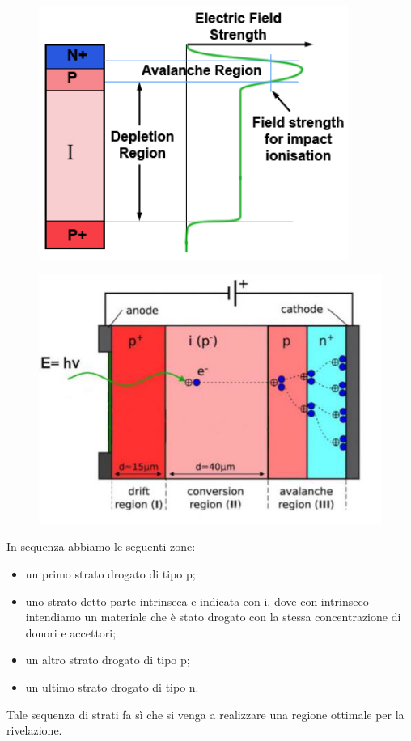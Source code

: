 \begin{minipage}{0.5\textwidth}
   \begin{figure}[H]
      \centering
      \includegraphics[width=0.9\textwidth]{immagini/APD_1.png}
   \end{figure}
\end{minipage}
\begin{minipage}{0.5\textwidth}
   \begin{figure}[H]
      \centering
      \includegraphics[width=\textwidth]{immagini/APD_2.png}
   \end{figure}
\end{minipage}

\vspace{0.4cm}In sequenza abbiamo le seguenti zone:
\begin{itemize}
   \item un primo strato drogato di tipo p;
   \item uno strato detto parte intrinseca e indicata con i, dove con intrinseco intendiamo un materiale che è stato drogato con la stessa concentrazione di donori e accettori;
   \item un altro strato drogato di tipo p;
   \item un ultimo strato drogato di tipo n.
\end{itemize}
Tale sequenza di strati fa sì che si venga a realizzare una regione ottimale per la rivelazione.

